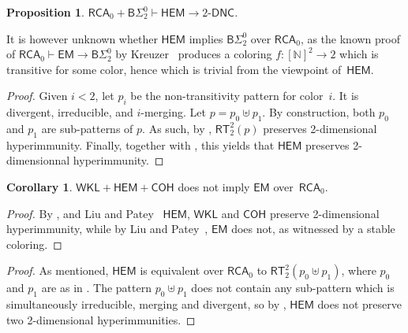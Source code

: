 \documentclass{article}
\newcommand{\BSig}{\mathsf{B}\Sigma^0}
\newcommand{\RCA}[0]{\mathsf{RCA}}
\newcommand{\WKL}[0]{\mathsf{WKL}}
\newcommand{\EM}[0]{\mathsf{EM}}
\newcommand{\RT}[0]{\mathsf{RT}}
\newcommand{\NN}[0]{\mathbb{N}}
\def\NN{\mathbb{N}}
\newcommand{\COH}{\mathsf{COH}}
\newcommand{\DNCS}[1]{#1\mbox{-}\mathsf{DNC}}
\newcommand{\HEM}{\mathsf{HEM}}
\numberwithin{theorem}{section}
\newtheorem{proposition}[theorem]{Proposition}
\theoremstyle{definition}
\newtheorem{corollary}[theorem]{Corollary}
\begin{document}
\begin{proposition}
$\RCA_0 + \BSig_2 \vdash \HEM \to \DNCS{2}$.
\end{proposition}

It is however unknown whether $\HEM$ implies $\BSig_2$ over $\RCA_0$,
as the known proof of $\RCA_0 \vdash \EM \to \BSig_2$ by Kreuzer~\cite{kreuzer2012primitive} produces a coloring $f : [\NN]^2 \to 2$ which is transitive for some color, hence which is trivial from the viewpoint of~$\HEM$.


\begin{proof}
Given $i < 2$, let $p_i$ be the non-transitivity pattern for color~$i$. It is divergent, irreducible, and $i$-merging. Let $p = p_0 \uplus p_1$. By construction, both $p_0$ and $p_1$ are sub-patterns of $p$. As such, by , $\RT_2^2(p)$ preserves 2-dimensional hyperimmunity. Finally, together with , this yields that $\HEM$ preserves 2-dimensionnal hyperimmunity.
\end{proof}

\begin{corollary}
    $\WKL + \HEM + \COH$ does not imply $\EM$ over~$\RCA_0$.
\end{corollary}
\begin{proof}
By , and Liu and Patey~\cite[Corollary 2.7, Corollary 2.9-]{liu2022reverse} $\HEM$, $\WKL$ and $\COH$ preserve 2-dimensional hyperimmunity, while by Liu and Patey~\cite[Corollary 2.12]{liu2022reverse},  $\EM$ does not, as witnessed by a stable coloring.
\end{proof}




\begin{proof}
 As mentioned, $\HEM$ is equivalent over $\RCA_0$ to $\RT^2_2(p_0 \uplus p_1)$, where $p_0$ and $p_1$ are as in . The pattern $p_0 \uplus p_1$ does not contain any sub-pattern which is simultaneously irreducible, merging and divergent, so by , $\HEM$ does not preserve two 2-dimensional hyperimmunities.
\end{proof}
\end{document}
